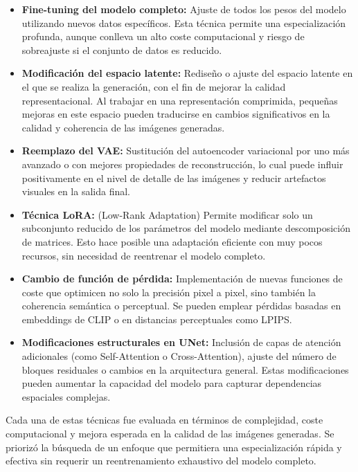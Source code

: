 \begin{itemize}
\item \textbf{Fine-tuning del modelo completo:} Ajuste de todos los pesos del modelo utilizando nuevos datos específicos. Esta técnica permite una especialización profunda, aunque conlleva un alto coste computacional y riesgo de sobreajuste si el conjunto de datos es reducido.

\item \textbf{Modificación del espacio latente:} Rediseño o ajuste del espacio latente en el que se realiza la generación, con el fin de mejorar la calidad representacional. Al trabajar en una representación comprimida, pequeñas mejoras en este espacio pueden traducirse en cambios significativos en la calidad y coherencia de las imágenes generadas.

\item \textbf{Reemplazo del VAE:} Sustitución del autoencoder variacional por uno más avanzado o con mejores propiedades de reconstrucción, lo cual puede influir positivamente en el nivel de detalle de las imágenes y reducir artefactos visuales en la salida final.

\item \textbf{Técnica LoRA:} (Low-Rank Adaptation) Permite modificar solo un subconjunto reducido de los parámetros del modelo mediante descomposición de matrices. Esto hace posible una adaptación eficiente con muy pocos recursos, sin necesidad de reentrenar el modelo completo.

\item \textbf{Cambio de función de pérdida:} Implementación de nuevas funciones de coste que optimicen no solo la precisión pixel a pixel, sino también la coherencia semántica o perceptual. Se pueden emplear pérdidas basadas en embeddings de CLIP o en distancias perceptuales como LPIPS.

\item \textbf{Modificaciones estructurales en UNet:} Inclusión de capas de atención adicionales (como Self-Attention o Cross-Attention), ajuste del número de bloques residuales o cambios en la arquitectura general. Estas modificaciones pueden aumentar la capacidad del modelo para capturar dependencias espaciales complejas.
\end{itemize}

Cada una de estas técnicas fue evaluada en términos de complejidad, coste computacional y mejora esperada en la calidad de las imágenes generadas. Se priorizó la búsqueda de un enfoque que permitiera una especialización rápida y efectiva sin requerir un reentrenamiento exhaustivo del modelo completo.

